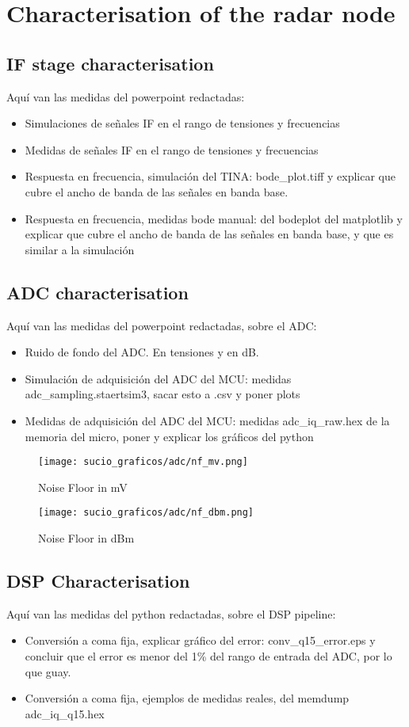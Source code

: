 \chapter{Characterisation of the radar node}
\section{IF stage characterisation}
Aquí van las medidas del powerpoint redactadas:
\begin{itemize}
	\item Simulaciones de señales IF en el rango de tensiones y frecuencias
	\item Medidas de señales IF en el rango de tensiones y frecuencias
	\item Respuesta en frecuencia, simulación del TINA: bode\_plot.tiff y explicar que cubre el ancho de banda de las señales en banda base.
	\item Respuesta en frecuencia, medidas bode manual: del bodeplot del matplotlib y explicar que cubre el ancho de banda de las señales en banda base, y que es similar a la simulación
\end{itemize}

\section{ADC characterisation}
Aquí van las medidas del powerpoint redactadas, sobre el ADC:
\begin{itemize}
	\item Ruido de fondo del ADC. En tensiones y en dB.
	\item Simulación de adquisición del ADC del MCU: medidas adc\_sampling.staertsim3, sacar esto a .csv y poner plots
	\item Medidas de adquisición del ADC del MCU: medidas adc\_iq\_raw.hex de la memoria del micro, poner y explicar los gráficos del python
\end{itemize}
\begin{figure}[ht]
	\centering
	\texttt{[image: sucio\_graficos/adc/nf\_mv.png]}
	\caption{Noise Floor in mV}
	\label{fig:moduloaprox50cmplancha}
\end{figure}
\begin{figure}[ht]
	\centering
	\texttt{[image: sucio\_graficos/adc/nf\_dbm.png]}
	\caption{Noise Floor in dBm}
	\label{fig:moduloaprox50cmplancha}
\end{figure}
\section{DSP Characterisation}
Aquí van las medidas del python redactadas, sobre el DSP pipeline:
\begin{itemize}
	\item Conversión a coma fija, explicar gráfico del error: conv\_q15\_error.eps y concluir que el error es menor del 1\% del rango de entrada del ADC, por lo que guay.
	\item Conversión a coma fija, ejemplos de medidas reales, del memdump adc\_iq\_q15.hex
\end{itemize}
